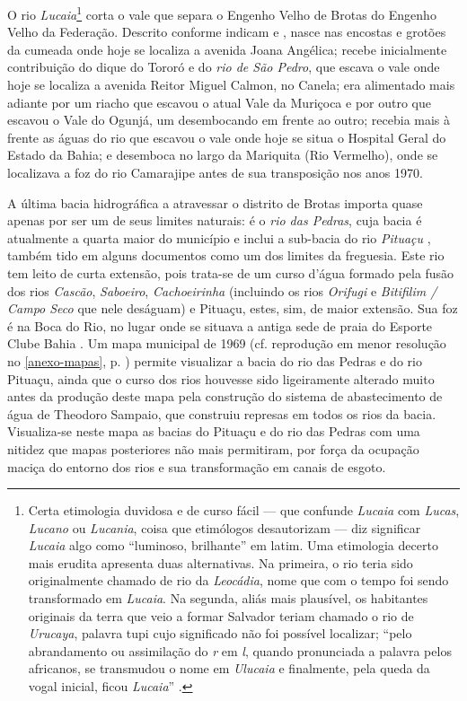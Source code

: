O rio \textit{Lucaia}\footnote{Certa etimologia duvidosa e de curso fácil --- que confunde \textit{Lucaia} com \textit{Lucas}, \textit{Lucano} ou \textit{Lucania}, coisa que etimólogos desautorizam \cite{guerios_nomes_1981} --- diz significar \textit{Lucaia} algo como ``luminoso, brilhante'' em latim. Uma etimologia decerto mais erudita apresenta duas alternativas. Na primeira, o rio teria sido originalmente chamado de rio da \textit{Leocádia}, nome que com o tempo foi sendo transformado em \textit{Lucaia}. Na segunda, aliás mais plausível, os habitantes originais da terra que veio a formar Salvador teriam chamado o rio de \textit{Urucaya}, palavra tupi cujo significado não foi possível localizar; ``pelo abrandamento ou assimilação do \textit{r} em \textit{l}, quando pronunciada a palavra pelos africanos, se transmudou o nome em \textit{Ulucaia} e finalmente, pela queda da vogal inicial, ficou \textit{Lucaia}'' \cite[p.~68]{amaral_resumo_2013}.} corta o vale que separa o Engenho Velho de Brotas do Engenho Velho da Federação. Descrito conforme indicam  e , nasce nas encostas e grotões da cumeada onde hoje se localiza a avenida Joana Angélica; recebe inicialmente contribuição do dique do Tororó e do \textit{rio de São Pedro}, que escava o vale onde hoje se localiza a avenida Reitor Miguel Calmon, no Canela; era alimentado mais adiante por um riacho que escavou o atual Vale da Muriçoca e por outro que escavou o Vale do Ogunjá, um desembocando em frente ao outro; recebia mais à frente as águas do rio que escavou o vale onde hoje se situa o Hospital Geral do Estado da Bahia; e desemboca no largo da Mariquita (Rio Vermelho), onde se localizava a foz do rio Camarajipe antes de sua transposição nos anos 1970.

A última bacia hidrográfica a atravessar o distrito de Brotas importa quase apenas por ser um de seus limites naturais: é o \textit{rio das Pedras}, cuja bacia é atualmente a quarta maior do município e inclui a sub-bacia do rio \textit{Pituaçu} \cite[p.~175]{santos_aguas_2010}, também tido em alguns documentos como um dos limites da freguesia. Este rio tem leito de curta extensão, pois trata-se de um curso d'água formado pela fusão dos rios \textit{Cascão}, \textit{Saboeiro}, \textit{Cachoeirinha} (incluindo os rios \textit{Orifugi} e \textit{Bitifilim / Campo Seco} que nele deságuam) e Pituaçu, estes, sim, de maior extensão. Sua foz é na Boca do Rio, no lugar onde se situava a antiga sede de praia do Esporte Clube Bahia \cite[p.~175]{santos_aguas_2010}. Um mapa municipal de 1969 \cite{salvador_mapa_1969} (cf. reprodução em menor resolução no \autoref{anexo-mapas}, p. \pageref{fig:1969-mapaprefeitura}) permite visualizar a bacia do rio das Pedras e do rio Pituaçu, ainda que o curso dos rios houvesse sido ligeiramente alterado muito antes da produção deste mapa pela construção do sistema de abastecimento de água de Theodoro Sampaio, que construiu represas em todos os rios da bacia. Visualiza-se neste mapa as bacias do Pituaçu e do rio das Pedras com uma nitidez que mapas posteriores não mais permitiram, por força da ocupação maciça do entorno dos rios e sua transformação em canais de esgoto.

